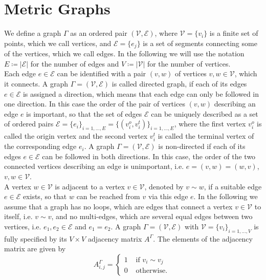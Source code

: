 \section{Metric Graphs}

We define a graph $\Gamma$ as an ordered pair $(\mathcal{V}, \mathcal{E})$, where $\mathcal{V} = \{v_i\}$ is a finite set of points, which we call vertices, and $\mathcal{E} = \{e_j\}$ is a set of segments connecting some of the vertices, which we call edges. In the following we will use the notation $E \coloneqq \left\lvert \mathcal{E} \right\rvert$ for the number of edges and $V \coloneqq \left\lvert \mathcal{V} \right\rvert$ for the number of vertices. \\
Each edge $e \in \mathcal{E}$ can be identified with a pair $(v, w)$ of vertices $v, w \in \mathcal{V}$, which it connects. A graph $\Gamma = (\mathcal{V}, \mathcal{E})$ is called directed graph, if each of its edges $e \in \mathcal{E}$ is assigned a direction, which means that each edge can only be followed in one direction. In this case the order of the pair of vertices $(v, w)$ describing an edge $e$ is important, so that the set of edges $\mathcal{E}$ can be uniquely described as a set of ordered pairs $\mathcal{E} = \{e_i\}_{i = 1, \ldots, E} = \{(v^{o}_{i}, v^{t}_{i})\}_{i = 1, \ldots, E}$, where the first vertex $v^{o}_{i}$ is called the origin vertex and the second vertex $v^{t}_{i}$ is called the terminal vertex of the corresponding edge $e_i$. A graph $\Gamma = (\mathcal{V}, \mathcal{E})$ is non-directed if each of its edges $e \in \mathcal{E}$ can be followed in both directions. In this case, the order of the two connected vertices describing an edge is unimportant, i.e. $e = (v, w) = (w, v)$, $v, w \in \mathcal{V}$. \\
A vertex $w \in \mathcal{V}$ is adjacent to a vertex $v \in \mathcal{V}$, denoted by $v \sim w$, if a suitable edge $e \in \mathcal{E}$ exists, so that $w$ can be reached from $v$ via this edge $e$. In the following we assume that a graph has no loops, which are edges that connect a vertex $v \in \mathcal{V}$ to itself, i.e. $v \sim v$, and no multi-edges, which are several equal edges between two vertices, i.e. $e_1, e_2 \in \mathcal{E}$ and $e_1= e_2$. A graph $\Gamma = (\mathcal{V}, \mathcal{E})$ with $\mathcal{V} = \{v_i\}_{i = 1, \ldots, V}$ is fully specified by its $V \times V$ adjacency matrix $A^{\Gamma}$. The elements of the adjacency matrix are given by
\begin{equation}
    \label{adjacency matrix}
    A^{\Gamma}_{i, j}= \begin{cases} 1 & \text { if } v_i \sim v_j \\ 0 & \text { otherwise. } \end{cases}
\end{equation}
